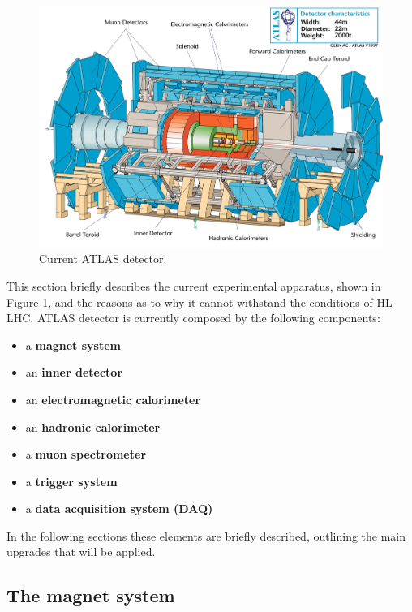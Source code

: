 \documentclass[a4paper,twoside,12pt]{article}
\begin{document}
\begin{figure} [h]
	\includegraphics[width=\textwidth]{atlasdet}
	\caption{Current ATLAS detector.}
	\label{fig:current_atlasdet}
\end{figure}

This section briefly describes the current experimental apparatus, shown in Figure \ref{fig:current_atlasdet}, and the reasons as to why it cannot withstand the conditions of HL-LHC.
\smallskip
ATLAS detector is currently composed by the following components:
\begin{itemize}
\item a \textbf{magnet system}
\item an \textbf{inner detector}
\item an \textbf{electromagnetic calorimeter}
\item an \textbf{hadronic calorimeter}
\item a \textbf{muon spectrometer}
\item a \textbf{trigger system}
\item a \textbf{data acquisition system (DAQ)}
\end{itemize}

In the following sections these elements are briefly described, outlining the main upgrades that will be applied. 

\subsection{The magnet system}\label{sec:magnet}
\end{document}
